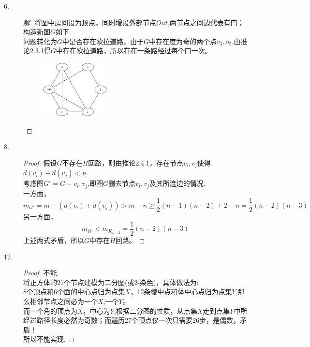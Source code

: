 \documentclass[UTF8, onecolumn, a4paper]{article}
\begin{document}
\begin{description}
\item[6.]
\begin{proof}[解]
将图中房间设为顶点，同时增设外部节点$Out$,两节点之间边代表有门；构造新图$G$如下.\\
问题转化为$G$中是否存在欧拉道路，由于$G$中存在度为奇的两个点$v_3,v_5$,由推论2.3.1得$G$中存在欧拉道路，所以存在一条路经过每个门一次。
\begin{figure}[h]
	\centering
	\includegraphics[width=0.35\textwidth]{demo2.png}
\end{figure}
\end{proof}

\item[8.]
\begin{proof}
假设$G$不存在$H$回路，则由推论2.4.1，存在节点$v_i, v_j$使得$d(v_i) + d(v_j) < n$.\\
考虑图$G' = G - {v_i, v_j}$,即图$G$删去节点$v_i, v_j$及其所连边的情况.\\
一方面，$$m_{G'} = m - (d(v_i) + d(v_j)) > m - n \geq \frac{1}{2}(n-1)(n-2) + 2 - n = \frac{1}{2}(n-2)(n-3)$$
另一方面，
$$m_{G'} < m_{K_{n-2}} = \frac{1}{2}(n-2)(n-3)$$
上述两式矛盾，所以$G$中存在$H$回路。
\end{proof}

\item[12.]
\begin{proof}
不能.\\
将正方体的27个节点建模为二分图(或2-染色)，具体做法为:\\8个顶点和6个面的中心点归为点集$X$，12条棱中点和体中心点归为点集$Y$,那么相邻节点之间必为一个$X$,一个$Y$。\\
而一个角的顶点为$X$，中心为$Y$,根据二分图的性质，从点集$X$走到点集$Y$中所经过路径长度必然为奇数；而遍历27个顶点仅一次只需要26步，是偶数，矛盾！\\
所以不能实现.
\end{proof}


\end{description}
\end{document}
